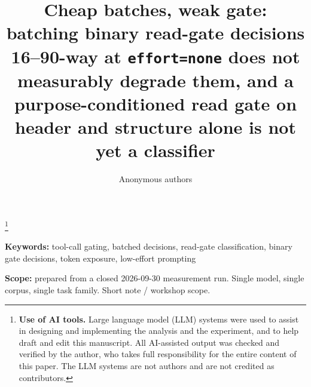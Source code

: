 \documentclass[10pt]{article}
\title{Cheap batches, weak gate: batching binary read-gate decisions 16--90-way at \texttt{effort=none} does not measurably degrade them, and a purpose-conditioned read gate on header and structure alone is not yet a classifier}
\author{Anonymous authors}
\date{}   %
\newcommand\blfootnote[1]{%
  \begingroup
  \renewcommand\thefootnote{}%
  \footnote{#1}%
  \addtocounter{footnote}{-1}%
  \endgroup}
\begin{document}
\maketitle

\blfootnote{\textbf{Use of AI tools.} Large language model (LLM) systems were used to assist in designing and implementing the analysis and the experiment, and to help draft and edit this manuscript. All AI-assisted output was checked and verified by the author, who takes full responsibility for the entire content of this paper. The LLM systems are not authors and are not credited as contributors.}
\noindent\textbf{Keywords:} tool-call gating, batched decisions, read-gate classification, binary gate decisions, token exposure, low-effort prompting

\textbf{Scope:} prepared from a closed 2026-09-30 measurement run. Single model, single corpus, single task family. Short note / workshop scope.
\end{document}

